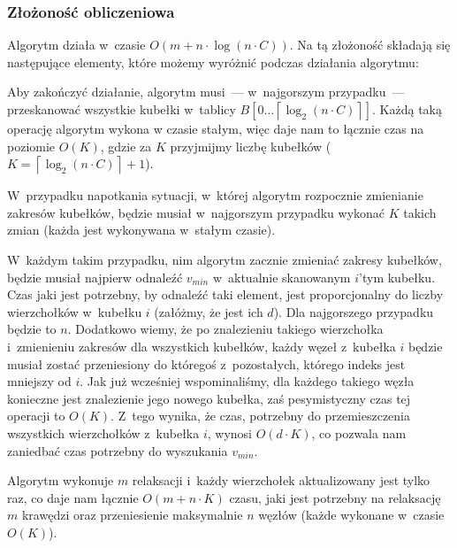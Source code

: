 \subsubsection{Złożoność obliczeniowa}


Algorytm działa w~czasie $O \left( m + n \cdot \log \left( n \cdot C \right) \right)$.
Na tą złożoność składają się następujące elementy, które możemy wyróżnić podczas działania algorytmu:

\begin{myitemize}
	\item Aby zakończyć działanie, algorytm musi~--- w~najgorszym przypadku~--- przeskanować wszystkie kubełki w~tablicy $B \left[ 0 \dots \left \lceil \log_{2} \left( n \cdot C \right) \right \rceil \right]$.
	Każdą taką operację algorytm wykona w czasie stałym, więc daje nam to łącznie czas na poziomie $O \left( K \right)$, gdzie za $K$ przyjmijmy liczbę kubełków ($K = \left \lceil \log_{2} \left( n \cdot C \right) \right \rceil + 1$).
	\item W~przypadku napotkania sytuacji, w~której algorytm rozpocznie zmienianie zakresów kubełków, będzie musiał w~najgorszym przypadku wykonać $K$ takich zmian (każda jest wykonywana w~stałym czasie).
	\item W~każdym takim przypadku, nim algorytm zacznie zmieniać zakresy kubełków, będzie musiał najpierw odnaleźć $v_{min}$ w~aktualnie skanowanym $i$'tym kubełku.
	Czas jaki jest potrzebny, by odnaleźć taki element, jest proporcjonalny do liczby wierzchołków w~kubełku $i$ (załóżmy, że jest ich $d$).
	Dla najgorszego przypadku będzie to $n$.
	Dodatkowo wiemy, że po znalezieniu takiego wierzchołka i~zmienieniu zakresów dla wszystkich kubełków, każdy węzeł z~kubełka $i$ będzie musiał zostać przeniesiony do któregoś z~pozostałych, którego indeks jest mniejszy od $i$.
	Jak już wcześniej wspominaliśmy, dla każdego takiego węzła konieczne jest znalezienie jego nowego kubełka, zaś pesymistyczny czas tej operacji to $O \left( K \right)$.
	Z~tego wynika, że czas, potrzebny do przemieszczenia wszystkich wierzchołków z~kubełka $i$, wynosi $O \left( d \cdot K \right)$, co pozwala nam zaniedbać czas potrzebny do wyszukania $v_{min}$.
	\item Algorytm wykonuje $m$ relaksacji i~każdy wierzchołek aktualizowany jest tylko raz, co daje nam łącznie $O \left( m + n \cdot K \right)$ czasu, jaki jest potrzebny na relaksację $m$ krawędzi oraz przeniesienie maksymalnie $n$ węzłów (każde wykonane w~czasie $O \left( K\right)$).
\end{myitemize}

